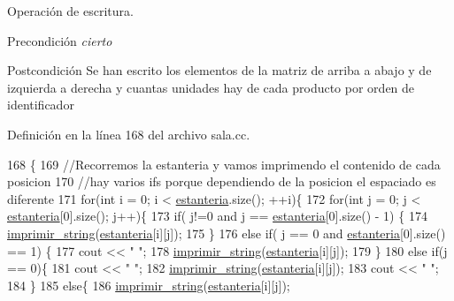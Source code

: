 Operación de escritura. 

\begin{DoxyPrecond}{Precondición}
{\itshape cierto} 
\end{DoxyPrecond}
\begin{DoxyPostcond}{Postcondición}
Se han escrito los elementos de la matriz de arriba a abajo y de izquierda a derecha y cuantas unidades hay de cada producto por orden de identificador 
\end{DoxyPostcond}


Definición en la línea 168 del archivo sala.\+cc.


\begin{DoxyCode}
168                          \{
169     \textcolor{comment}{//Recorremos la estanteria y vamos imprimendo el contenido de cada posicion}
170     \textcolor{comment}{//hay varios ifs porque dependiendo de la posicion el espaciado es diferente}
171     \textcolor{keywordflow}{for}(\textcolor{keywordtype}{int} i = 0; i < \mbox{\hyperlink{class_sala_a8f5264818c98db9c0d075c51a7672d95}{estanteria}}.size(); ++i)\{
172         \textcolor{keywordflow}{for}(\textcolor{keywordtype}{int} j = 0; j < \mbox{\hyperlink{class_sala_a8f5264818c98db9c0d075c51a7672d95}{estanteria}}[0].size(); j++)\{
173             \textcolor{keywordflow}{if}( j!=0 and j == \mbox{\hyperlink{class_sala_a8f5264818c98db9c0d075c51a7672d95}{estanteria}}[0].size() - 1) \{
174                 \mbox{\hyperlink{sala_8cc_ac1916f29be6c9137b2df1079e26c54f3}{imprimir\_string}}(\mbox{\hyperlink{class_sala_a8f5264818c98db9c0d075c51a7672d95}{estanteria}}[i][j]);
175             \}
176             \textcolor{keywordflow}{else} \textcolor{keywordflow}{if}( j == 0 and \mbox{\hyperlink{class_sala_a8f5264818c98db9c0d075c51a7672d95}{estanteria}}[0].size() == 1) \{
177                 cout << \textcolor{stringliteral}{"  "};
178                 \mbox{\hyperlink{sala_8cc_ac1916f29be6c9137b2df1079e26c54f3}{imprimir\_string}}(\mbox{\hyperlink{class_sala_a8f5264818c98db9c0d075c51a7672d95}{estanteria}}[i][j]);
179             \}
180             \textcolor{keywordflow}{else} \textcolor{keywordflow}{if}(j == 0)\{
181                 cout << \textcolor{stringliteral}{"  "};
182                 \mbox{\hyperlink{sala_8cc_ac1916f29be6c9137b2df1079e26c54f3}{imprimir\_string}}(\mbox{\hyperlink{class_sala_a8f5264818c98db9c0d075c51a7672d95}{estanteria}}[i][j]);
183                 cout << \textcolor{stringliteral}{" "};
184             \}
185             \textcolor{keywordflow}{else}\{
186                 \mbox{\hyperlink{sala_8cc_ac1916f29be6c9137b2df1079e26c54f3}{imprimir\_string}}(\mbox{\hyperlink{class_sala_a8f5264818c98db9c0d075c51a7672d95}{estanteria}}[i][j]);

\end{DoxyCode}
